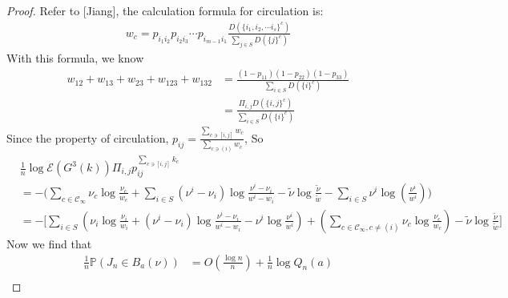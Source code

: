 \documentclass[11pt,en,cite=authoryear]{elegantpaper}
\begin{document}
\begin{proof}
    Refer to [Jiang], the calculation formula
    for circulation is:
    \begin{align*}
        w_c = p_{i_1 i_2} p_{i_2 i_3} \cdots p_{i_{m-1} i_1} \frac{D(\{i_1, i_2, \cdots i_s\}^c)}{\sum_{j\in S} D(\{j\}^c)}
    \end{align*}
    With this formula, we know
    \begin{align*}
        w_{12}+w_{13}+w_{23}+w_{123}+w_{132} &= \frac{(1-p_{11})(1-p_{22})(1-p_{33})}{\sum_{i\in S} D(\{i\}^c)} \\
        &= \frac{\Pi_{i, j} D(\{i, j\}^c)}{\sum_{i\in S} D(\{i\}^c)}
    \end{align*}
    Since the property of circulation, $p_{ij} = \frac{\sum_{c \ni [i,j]} w_c}{\sum_{c \ni (i)} w_c}$, So
    \begin{align*}
        &\frac{1}{n} \log \mathcal{E} (G^3(k)) \Pi_{i, j} p_{ij}^{\sum_{c \ni [i,j]} k_{c}} \\
        &= -\bigl(\sum_{c \in \mathcal{C}_{\infty}} \nu_{c} \log \frac{\nu_{c}}{w_c} + \sum_{i\in S}(\nu^i - \nu_i)\log \frac{\nu^i - \nu_i}{w^i - w_i} 
        -\tilde{\nu}\log \frac{\tilde{\nu} }{\tilde{w} }
        -\sum_{i\in S} \nu^i \log (\frac{\nu^i}{w^i}) \bigr) \\
        &= -\biggl[\sum_{i\in S} \left(\nu_{i}\log \frac{\nu_{i}}{w_i} + (\nu^i - \nu_i)\log \frac{\nu^i - \nu_i}{w^i - w_i} 
        - \nu^i \log \frac{\nu^i}{w^i} \right)
        + \left(\sum_{c \in \mathcal{C}_{\infty}, c\neq (i)} \nu_{c} \log \frac{\nu_{c}}{w_c} \right)
        -\tilde{\nu}\log \frac{\tilde{\nu} }{\tilde{w} }\biggr]
    \end{align*}
    Now we find that
    \begin{align*}
        \frac{1}{n} \mathbb{P}(J_n \in B_a(\nu))
        &= O(\frac{\log n}{n}) + \frac{1}{n} \log Q_n(a) \\

\end{align*}
\end{proof}
\end{document}

